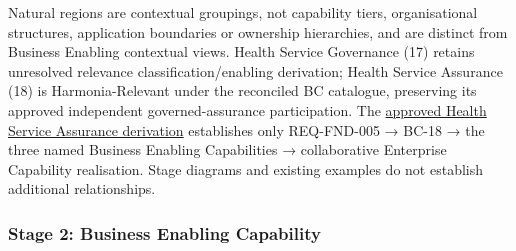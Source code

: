 Natural regions are contextual groupings, not capability tiers, organisational structures, application boundaries or ownership hierarchies, and are distinct from Business Enabling contextual views. Health Service Governance (17) retains unresolved relevance classification/\allowbreak{}enabling derivation; Health Service Assurance (18) is Harmonia-Relevant under the reconciled BC catalogue, preserving its approved independent governed-assurance participation. The \hyperref[rad:assurance-strategy]{approved Health Service Assurance derivation} establishes only REQ-FND-005 → BC-18 → the three named Business Enabling Capabilities → collaborative Enterprise Capability realisation. Stage diagrams and existing examples do not establish additional relationships.

\label{rad:tier-model:108}
\subsubsection*{Stage 2: Business Enabling Capability}
\label{rad:tier-model:109}


